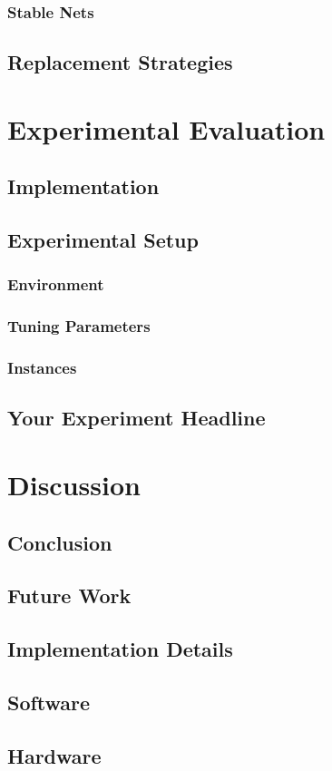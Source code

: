 \documentclass[a4paper,12pt,bibtotoc,titlepage, liststotoc,BCOR7mm,headsepline,pointlessnumbers]{scrbook}
\numberwithin{equation}{section}
\begin{document}
\subsection{Stable Nets}
\section{Replacement Strategies}
\chapter{Experimental Evaluation}
\section{Implementation}
\section{Experimental Setup}
\subsection{Environment}
\subsection{Tuning Parameters}
\subsection{Instances}
\section{Your Experiment Headline}
\chapter{Discussion}
\section{Conclusion}
\section{Future Work}

\clearpage
\begin{appendix}
\chapter{Implementation Details}
\section{Software}
\section{Hardware}
\end{appendix}


\end{document}
